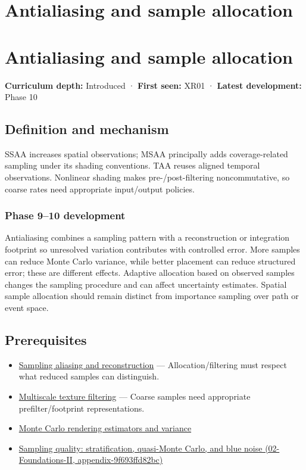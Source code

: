 \hypertarget{appendix-4192b2bdd21e}{}
\section*{Antialiasing and sample allocation}
\section{Antialiasing and sample allocation}\label{antialiasing-and-sample-allocation}

\textbf{Curriculum depth:} Introduced · \textbf{First seen:} XR01 · \textbf{Latest development:} Phase 10

\subsection{Definition and mechanism}\label{definition-and-mechanism}

SSAA increases spatial observations; MSAA principally adds coverage-related sampling under its shading conventions. TAA reuses aligned temporal observations. Nonlinear shading makes pre-/post-filtering noncommutative, so coarse rates need appropriate input/output policies.

\subsubsection{Phase 9--10 development}\label{phase-910-development}

Antialiasing combines a sampling pattern with a reconstruction or integration footprint so unresolved variation contributes with controlled error. More samples can reduce Monte Carlo variance, while better placement can reduce structured error; these are different effects. Adaptive allocation based on observed samples changes the sampling procedure and can affect uncertainty estimates. Spatial sample allocation should remain distinct from importance sampling over path or event space.

\subsection{Prerequisites}\label{prerequisites}

\begin{itemize}
\tightlist
\item
  \hyperref[appendix-6a7869dd79a6]{Sampling aliasing and reconstruction} --- Allocation/filtering must respect what reduced samples can distinguish.
\item
  \hyperref[appendix-b677a85ba76f]{Multiscale texture filtering} --- Coarse samples need appropriate prefilter/footprint representations.
\item
  \hyperref[appendix-031e02bf28af]{Monte Carlo rendering estimators and variance}
\item
  \href{}{Sampling quality: stratification, quasi-Monte Carlo, and blue noise (02-Foundations-II, appendix-9f693ffd82bc)}
\end{itemize}

